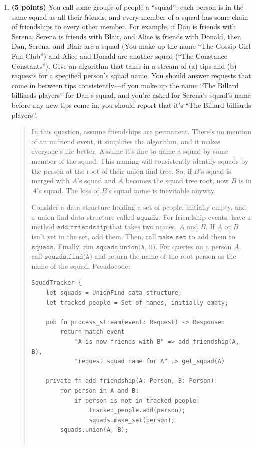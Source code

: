 \documentclass[11pt]{article}
\newcommand{\code}[1]{$\texttt{#1}$}
\begin{document}
\begin{enumerate}
\begin{enumerate}
\item {\bf (5 points)}
    You call some groups of people a ``squad'': each person is in the same squad as all their friends, and every member of a squad has some chain of friendships to every other member. For example, if Dan is friends with Serena, Serena is friends with Blair, and Alice is friends with Donald, then Dan, Serena, and Blair are a squad (You make up the name ``The Gossip Girl Fan Club'') and Alice and Donald are another squad (``The Constance Constants''). Give an algorithm that takes in a stream of (a) tips and (b) requests for a specified person's squad name. You should answer requests that come in between tips consistently---if you make up the name ``The Billard billiards players'' for Dan's squad, and you're asked for Serena's squad's name before any new tips come in, you should report that it's ``The Billard billiards players''.
    \begin{quote}
      \color{purple}

In this question, assume friendships are permanent. There's no mention of an unfriend event, it simplifies the algorithm, and it makes everyone's life better. Assume it's fine to name a squad by some member of the squad. This naming will consistently identify squads by the person at the root of their union find tree. So, if $B$'s squad is merged with $A$'s squad and $A$ becomes the squad tree root, now $B$ is in $A$'s squad. The loss of $B$'s squad name is inevitable anyway.

\medskip
Consider a data structure holding a set of people, initially empty, and a union find data structure called \code{squads}. For friendship events, have a method \code{add\_friendship} that takes two names, $A$ and $B$. If $A$ or $B$ isn't yet in the set, add them. Then, call \code{make\_set} to add them to \code{squads}. Finally, run \code{squads.union(A, B)}. For queries on a person $A$, call \code{squads.find(A)} and return the name of the root person as the name of the squad. Pseudocode:
\begin{verbatim}
SquadTracker {
    let squads = UnionFind data structure;
    let tracked_people = Set of names, initially empty;

    pub fn process_stream(event: Request) -> Response:
        return match event 
            "A is now friends with B" => add_friendship(A, B),
            "request squad name for A" => get_squad(A)

    private fn add_friendship(A: Person, B: Person):
        for person in A and B:
            if person is not in tracked_people:
                tracked_people.add(person);
                squads.make_set(person);
        squads.union(A, B);
    

\end{verbatim}
\end{quote}
\end{enumerate}
\end{enumerate}
\end{document}
